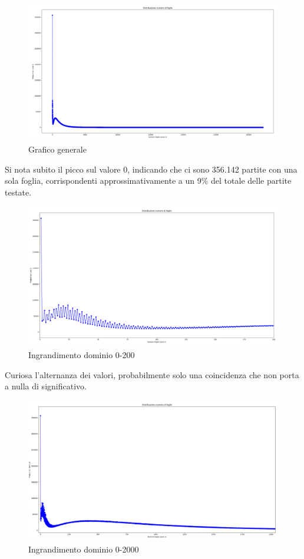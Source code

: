 \documentclass[a4paper,12pt]{report}
\begin{document}
\begin{figure}[h!]
    \centering
    \includegraphics[width=1\textwidth]{imgs/grafico_base.png} 
    \caption{Grafico generale}
    \label{fig:etichetta}
\end{figure}

Si nota subito il picco sul valore 0, indicando che ci sono 356.142 partite con una sola foglia, corrispondenti approssimativamente a un 9\% del totale delle partite testate.


\begin{figure}[h!]
    \centering
    \includegraphics[width=1\textwidth]{imgs/grafico_0_200.png} 
    \caption{Ingrandimento dominio 0-200}
    \label{fig:etichetta}
\end{figure}

Curiosa l'alternanza dei valori, probabilmente solo una coincidenza che non porta a nulla di significativo.

\begin{figure}[h!]
    \centering
    \includegraphics[width=1\textwidth]{imgs/grafico_0_2000.png} 
    \caption{Ingrandimento dominio 0-2000}
    \label{fig:etichetta}
\end{figure}
\end{document}
